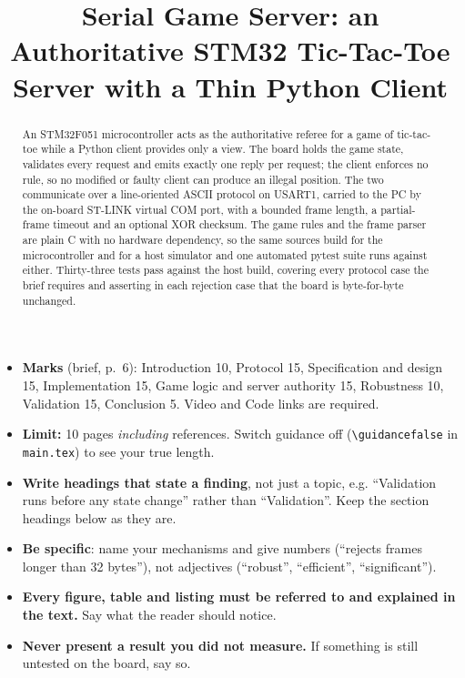 \documentclass[conference]{IEEEtran}
\newif\ifguidance
\newenvironment{guidance}[1][Guidance]
  {\ifguidance\begin{guidebox}[#1]\else\setbox0\vbox\bgroup\fi}
  {\ifguidance\end{guidebox}\else\egroup\fi}
\begin{document}
\title{Serial Game Server: an Authoritative STM32 Tic-Tac-Toe\\
Server with a Thin Python Client}

\author{
}

\maketitle

\begin{abstract}
An STM32F051 microcontroller acts as the authoritative referee for a game of
tic-tac-toe while a Python client provides only a view. The board holds the game
state, validates every request and emits exactly one reply per request; the
client enforces no rule, so no modified or faulty client can produce an illegal
position. The two communicate over a line-oriented ASCII protocol on USART1,
carried to the PC by the on-board ST-LINK virtual COM port, with a bounded frame
length, a partial-frame timeout and an optional XOR checksum. The game rules and
the frame parser are plain C with no hardware dependency, so the same sources
build for the microcontroller and for a host simulator and one automated pytest
suite runs against either. Thirty-three tests pass against the host build,
covering every protocol case the brief requires and asserting in each rejection
case that the board is byte-for-byte unchanged.
\end{abstract}

\begin{guidance}[Before you start writing]
\begin{itemize}\setlength\itemsep{0pt}
\item \textbf{Marks} (brief, p.~6): Introduction 10, Protocol 15, Specification
  and design 15, Implementation 15, Game logic and server authority 15,
  Robustness 10, Validation 15, Conclusion 5. Video and Code links are required.
\item \textbf{Limit:} 10 pages \emph{including} references. Switch guidance off
  (\texttt{\textbackslash guidancefalse} in \texttt{main.tex}) to see your true length.
\item \textbf{Write headings that state a finding}, not just a topic, e.g.
  ``Validation runs before any state change'' rather than ``Validation''.
  Keep the section headings below as they are.
\item \textbf{Be specific}: name your mechanisms and give numbers
  (``rejects frames longer than 32 bytes''), not adjectives (``robust'',
  ``efficient'', ``significant'').
\item \textbf{Every figure, table and listing must be referred to and explained
  in the text.} Say what the reader should notice.
\item \textbf{Never present a result you did not measure.} If something is still
  untested on the board, say so.
\end{itemize}
\end{guidance}
\end{document}

